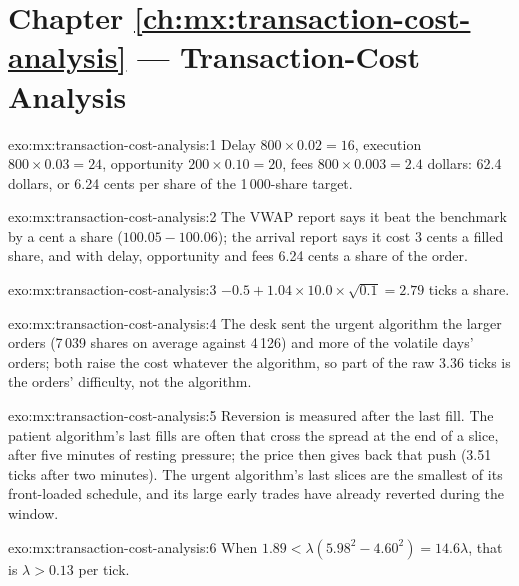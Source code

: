 \section*{Chapter \ref{ch:mx:transaction-cost-analysis} --- Transaction-Cost Analysis}

\begin{solution}{exo:mx:transaction-cost-analysis:1}
Delay $800\times0.02=16$, execution $800\times0.03=24$, opportunity $200\times0.10=20$, fees $800\times0.003=2.4$ dollars: 62.4 dollars, or 6.24 cents
per share of the 1\,000-share target.
\end{solution}

\begin{solution}{exo:mx:transaction-cost-analysis:2}
The VWAP report says it beat the benchmark by a cent a share ($100.05-100.06$); the arrival report says it cost 3 cents a filled share, and with delay,
opportunity and fees 6.24 cents a share of the order.
\end{solution}

\begin{solution}{exo:mx:transaction-cost-analysis:3}
$-0.5+1.04\times10.0\times\sqrt{0.1}=2.79$ ticks a share.
\end{solution}

\begin{solution}{exo:mx:transaction-cost-analysis:4}
The desk sent the urgent algorithm the larger orders (7\,039 shares on average against 4\,126) and more of the volatile days' orders; both raise the
cost whatever the algorithm, so part of the raw 3.36 ticks is the orders' difficulty, not the algorithm.
\end{solution}

\begin{solution}{exo:mx:transaction-cost-analysis:5}
Reversion is measured after the last fill. The patient algorithm's last fills are often  that cross the spread at the end of a slice,
after five minutes of resting pressure; the price then gives back that push (3.51 ticks after two minutes). The urgent algorithm's last slices are the
smallest of its front-loaded schedule, and its large early trades have already reverted during the window.
\end{solution}

\begin{solution}{exo:mx:transaction-cost-analysis:6}
When $1.89<\lambda(5.98^2-4.60^2)=14.6\lambda$, that is $\lambda>0.13$ per tick.
\end{solution}

